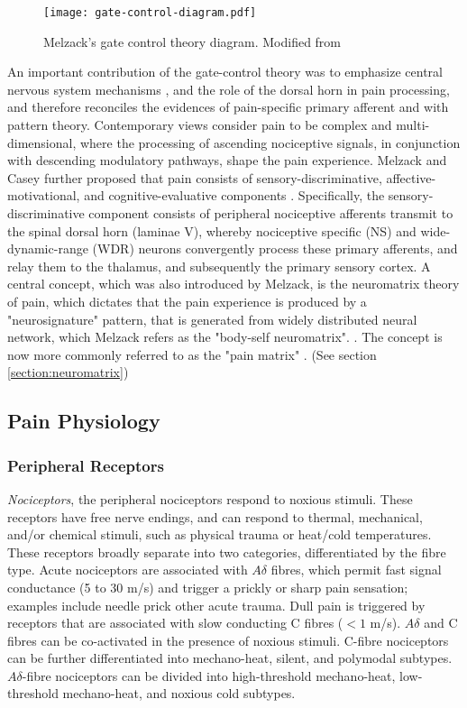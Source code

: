  \begin{figure}[ht]
 \texttt{[image: gate-control-diagram.pdf]}
 \centering
 \caption{Melzack's gate control theory diagram. Modified from \protect\cite{Melzack1965a}}
 \label{fig:gate-theory} 
 \end{figure}
 
An important contribution of the gate-control theory was to emphasize central nervous system mechanisms \cite{Melzack1999}, and the role of the dorsal horn in pain processing, and therefore reconciles the evidences of pain-specific primary afferent and with pattern theory. Contemporary views consider pain to be complex and multi-dimensional, where the processing of ascending nociceptive signals, in conjunction with descending modulatory pathways, shape the pain experience. Melzack and Casey further proposed that pain consists of sensory-discriminative, affective-motivational, and cognitive-evaluative components \cite{Melzack1968}. Specifically, the sensory-discriminative component consists of peripheral nociceptive afferents transmit to the spinal dorsal horn (laminae V), whereby nociceptive specific (NS) and wide-dynamic-range (WDR) neurons convergently process these primary afferents, and relay them to the thalamus, and subsequently the primary sensory cortex. A central concept, which was also introduced by Melzack, is the  neuromatrix theory of pain, which dictates that the pain experience is produced by a "neurosignature" pattern, that is generated from widely distributed neural network, which Melzack refers as the "body-self neuromatrix". \cite{Melzack1999}. The concept is now more commonly referred to as the "pain matrix" \cite{tracey2007a}. (See section \ref{section:neuromatrix})


\subsection{Pain Physiology}

\subsubsection{Peripheral Receptors}

\textit{Nociceptors}, the peripheral nociceptors respond to noxious stimuli. These receptors have free nerve endings, and can respond to thermal, mechanical, and/or chemical stimuli, such as physical trauma or heat/cold temperatures. These receptors broadly separate into two categories, differentiated by the fibre type. Acute nociceptors are associated with $A\delta$ fibres, which permit fast signal conductance (5 to 30 m/s) and trigger a prickly or sharp pain sensation; examples include needle prick other acute trauma. Dull pain is triggered by receptors that are associated with slow conducting C fibres ($<1$ m/s). $A\delta$ and C fibres can be co-activated in the presence of noxious stimuli. C-fibre nociceptors can be further differentiated into mechano-heat, silent, and polymodal subtypes. $A\delta$-fibre nociceptors can be divided into high-threshold mechano-heat, low-threshold mechano-heat, and noxious cold subtypes.

